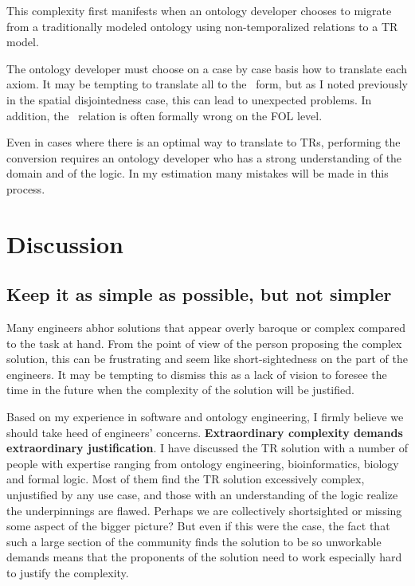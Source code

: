 \documentclass{bioinfo}
\def\atAllTimes{\pr{at-all-times}}
\begin{document}
This complexity first manifests when an ontology developer chooses to
migrate from a traditionally modeled ontology using non-temporalized
relations to a TR model.

The ontology developer must choose on a case by case basis how to
translate each axiom. It may be tempting to translate all to the
\atAllTimes\ form, but as I noted previously in the spatial
disjointedness case, this can lead to unexpected problems. In
addition, the \atAllTimes\ relation is often formally wrong on the FOL
level.

Even in cases where there is an optimal way to translate to TRs,
performing the conversion requires an ontology developer who has a
strong understanding of the domain and of the logic. In my estimation
many mistakes will be made in this process.


\section{Discussion}

\subsection{Keep it as simple as possible, but not simpler}

Many engineers abhor solutions that appear overly baroque or complex
compared to the task at hand. From the point of view of the person
proposing the complex solution, this can be frustrating and seem like
short-sightedness on the part of the engineers. It may be tempting to
dismiss this as a lack of vision to foresee the time in the future
when the complexity of the solution will be justified.

Based on my experience in software and ontology engineering, I firmly
believe we should take heed of engineers'
concerns. \textbf{Extraordinary complexity demands extraordinary
  justification}.  I have discussed the TR solution with a number of
people with expertise ranging from ontology engineering,
bioinformatics, biology and formal logic. Most of them find the TR
solution excessively complex, unjustified by any use case, and those
with an understanding of the logic realize the underpinnings are
flawed. Perhaps we are collectively shortsighted or missing some
aspect of the bigger picture? But even if this were the case, the fact
that such a large section of the community finds the solution to be so
unworkable demands means that the proponents of the solution need to
work especially hard to justify the complexity.
\end{document}
